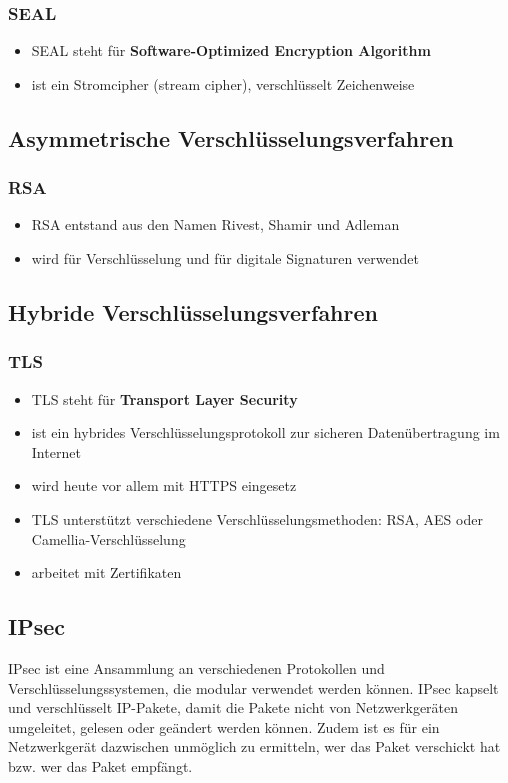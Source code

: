 \subsubsection{SEAL}

\begin{itemize}
\item SEAL steht für \textbf{Software-Optimized Encryption Algorithm}
\item ist ein Stromcipher (stream cipher), verschlüsselt Zeichenweise
\end{itemize}

\subsection{Asymmetrische Verschlüsselungsverfahren}

\subsubsection{RSA}

\begin{itemize}
\item RSA entstand aus den Namen Rivest, Shamir und Adleman
\item wird für Verschlüsselung und für digitale Signaturen verwendet
\end{itemize}

\subsection{Hybride Verschlüsselungsverfahren}

\subsubsection{TLS}

\begin{itemize}
\item TLS steht für \textbf{Transport Layer Security}
\item ist ein hybrides Verschlüsselungsprotokoll zur sicheren Datenübertragung im Internet
\item wird heute vor allem mit HTTPS eingesetz
\item TLS unterstützt verschiedene Verschlüsselungsmethoden: RSA, AES oder Camellia-Verschlüsselung
\item arbeitet mit Zertifikaten
\end{itemize}

\subsection{IPsec}

IPsec ist eine Ansammlung an verschiedenen Protokollen und Verschlüsselungssystemen, die modular verwendet werden können. IPsec kapselt und verschlüsselt IP-Pakete, damit die Pakete nicht von Netzwerkgeräten umgeleitet, gelesen oder geändert werden können. Zudem ist es für ein Netzwerkgerät dazwischen unmöglich zu ermitteln, wer das Paket verschickt hat bzw. wer das Paket empfängt.